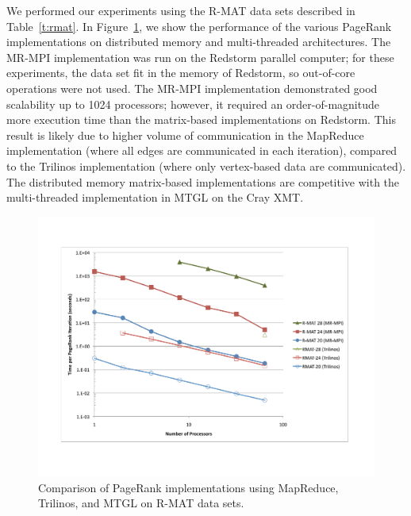 We performed our experiments using the R-MAT data sets described in 
Table~\ref{t:rmat}.  
In Figure~\ref{f:prbig}, we show the performance 
of the various PageRank
implementations on distributed memory and multi-threaded architectures.
The MR-MPI implementation was run on the Redstorm parallel computer;
for these experiments,
the data set fit in the memory of Redstorm, so out-of-core operations
were not used.
The MR-MPI implementation demonstrated good scalability up to 1024 processors; 
however, it required an order-of-magnitude
more execution time than the matrix-based implementations on Redstorm.  
This result is likely due to higher volume of
communication in the MapReduce implementation (where all edges are communicated
in each iteration), compared to the Trilinos implementation (where only
vertex-based data are communicated).  The distributed memory matrix-based
implementations are competitive with the multi-threaded implementation
in MTGL on the Cray XMT.

\begin{figure}[h!]
\includegraphics[width=\textwidth]{fig_pagerank.pdf}
\caption{Comparison of PageRank implementations using MapReduce,
Trilinos, and MTGL on R-MAT data sets.}
\label{f:prbig}
\end{figure}

